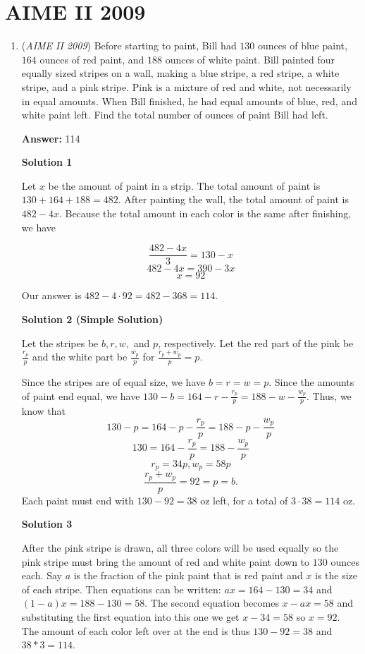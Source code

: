 \section{AIME II 2009}
        \begin{enumerate}
        	\item (\textit{AIME II 2009}) Before starting to paint, Bill had $130$ ounces of blue paint, $164$ ounces of red paint, and $188$ ounces of white paint. Bill painted four equally sized stripes on a wall, making a blue stripe, a red stripe, a white stripe, and a pink stripe. Pink is a mixture of red and white, not necessarily in equal amounts. When Bill finished, he had equal amounts of blue, red, and white paint left. Find the total number of ounces of paint Bill had left.


 
 \textbf{Answer: }114



\textbf{Solution 1}

Let $x$ be the amount of paint in a strip. The total amount of paint is $130+164+188=482$. After painting the wall, the total amount of paint is $482-4x$. Because the total amount in each color is the same after finishing, we have

 
 \[\frac{482-4x}{3} = 130-x\]
 \[482-4x=390-3x\]
 \[x=92\]

 Our answer is $482-4\cdot 92 = 482 - 368 = \boxed{114}$.

 



\textbf{Solution 2 (Simple Solution)}

Let the stripes be $b, r, w,$ and $p$, respectively. Let the red part of the pink be $\frac{r_p}{p}$ and the white part be $\frac{w_p}{p}$ for $\frac{r_p+w_p}{p}=p$.

 Since the stripes are of equal size, we have $b=r=w=p$. Since the amounts of paint end equal, we have $130-b=164-r-\frac{r_p}{p}=188-w-\frac{w_p}{p}$. Thus, we know that
 \[130-p=164-p-\frac{r_p}{p}=188-p-\frac{w_p}{p}\]
 \[130=164-\frac{r_p}{p}=188-\frac{w_p}{p}\]
 \[r_p=34p, w_p=58p\]
 \[\frac{r_p+w_p}{p}=92=p=b.\]Each paint must end with $130-92=38$ oz left, for a total of $3 \cdot 38 = \boxed{114}$ oz.

 



\textbf{Solution 3}

After the pink stripe is drawn, all three colors will be used equally so the pink stripe must bring the amount of red and white paint down to $130$ ounces each. Say $a$ is the fraction of the pink paint that is red paint and $x$ is the size of each stripe. Then equations can be written: $ax = 164 - 130 = 34$ and $(1-a)x = 188 - 130 = 58$. The second equation becomes $x - ax = 58$ and substituting the first equation into this one we get $x - 34 = 58$ so $x = 92$. The amount of each color left over at the end is thus $130 - 92 = 38$ and $38 * 3 = \boxed{114}$.


\end{enumerate}
